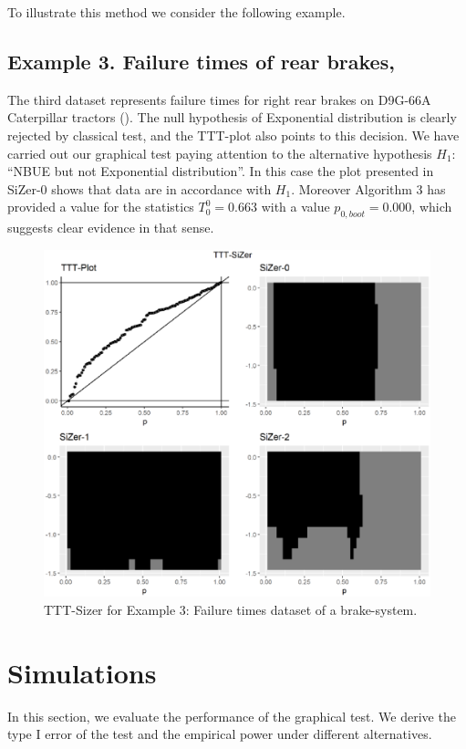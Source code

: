 \documentclass[preprint,12pt]{elsarticle}
\begin{document}
To illustrate this method we consider the following example. 
\subsection*{Example 3. Failure times of rear brakes, \cite{BC75}}
The third dataset represents failure times for right rear brakes on D9G-66A Caterpillar tractors (\cite{BC75}). The null hypothesis of Exponential distribution is clearly rejected by classical test, and the TTT-plot also points to this decision. We have carried out our graphical test paying attention to the alternative hypothesis $H_1$: ``NBUE but not Exponential distribution''. In this case the plot presented in SiZer-0 shows that data are in accordance with $H_1$. Moreover Algorithm 3 has provided a value for the statistics $T_0^0=0.663$ with a value $p_{0,boot}=0.000$, which suggests clear evidence in that sense. 

\begin{figure}[htb]
\begin{center}
\includegraphics[height= 0.7\textwidth]{brakes_log10.EPS}
\caption{TTT-Sizer for Example 3: Failure times dataset of a brake-system.}\label{Fig:brakes}
\end{center}
\end{figure}
%



\bigskip
\section{Simulations}\label{sec:sim}
In this section, we evaluate the performance of the graphical test. We derive the type I error of the test and the empirical power under different alternatives.%
\end{document}
